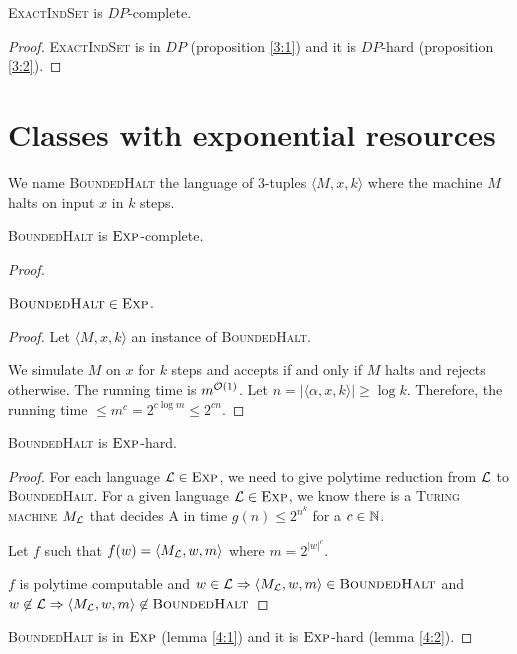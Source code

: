 \begin{theoreme}
    \textsc{ExactIndSet} is $DP$-complete.
\end{theoreme}
\begin{proof}
    \textsc{ExactIndSet} is in $DP$ (proposition \ref{3:1}) and it is $DP$-hard (proposition \ref{3:2}).
\end{proof}

\section{Classes with exponential resources}

We name \textsc{BoundedHalt} the language of 3-tuples $\langle M,x,k\rangle$ where the machine $M$ halts on input $x$ in $k$ steps.

\begin{thm}
    \textsc{BoundedHalt} is $\textsc{Exp}$-complete.
\end{thm}
\begin{proof}

\begin{lemma}\label{4:1}
    $\textsc{BoundedHalt} \in \textsc{Exp}$.
\end{lemma}
\begin{proof}
Let $\langle M,x,k\rangle$ an instance of \textsc{BoundedHalt}.

We simulate $M$ on $x$ for $k$ steps and accepts if and only if $M$ halts and rejects otherwise. The running time is $m^{\mathcal O \left( 1 \right)}$. Let $n = \vert \langle\alpha,x,k\rangle \vert \geqslant \log k$. Therefore, the running time $\leqslant m^c = 2^{c\log m} \leqslant 2^{cn}$.
\end{proof}

\begin{lemma}\label{4:2}
    \textsc{BoundedHalt} is $\textsc{Exp}$-hard.
\end{lemma}
\begin{proof}
For each language $\mathcal{L} \in \textsc{Exp}$, we need to give polytime reduction from $\mathcal{L}$ to \textsc{BoundedHalt}. For a given language $\mathcal{L} \in \textsc{Exp}$, we know there is a \textsc{Turing machine} $M_{\mathcal{L}}$ that decides A in time $g(n) \leqslant 2^{n^k}$ for a $c\in\mathbb{N}$.

Let $f$ such that $f(w) = \langle M_{\mathcal{L}}, w, m\rangle$ where $m = 2^{|w|^c}$.

$f$ is polytime computable and $w \in \mathcal{L} \Rightarrow \langle M_{\mathcal{L}}, w, m\rangle \in \textsc{BoundedHalt}$ and $w \not\in \mathcal{L} \Rightarrow \langle M_{\mathcal{L}}, w, m\rangle \not\in \textsc{BoundedHalt}$
\end{proof}
    \textsc{BoundedHalt} is in $\textsc{Exp}$ (lemma \ref{4:1}) and it is $\textsc{Exp}$-hard (lemma \ref{4:2}).
\end{proof}

